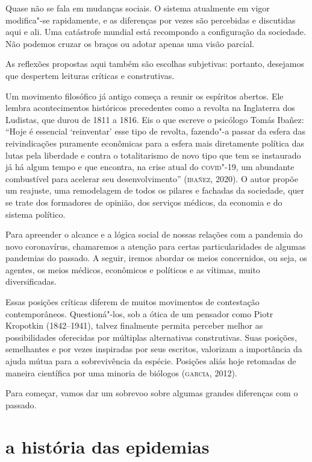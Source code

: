 Quase não se fala em mudanças sociais. O sistema atualmente em vigor
modifica"-se rapidamente, e as diferenças por vezes são percebidas e
discutidas aqui e ali. Uma catástrofe mundial está recompondo a
configuração da sociedade. Não podemos cruzar os braços ou adotar apenas
uma visão parcial.

As reflexões propostas aqui também são escolhas subjetivas: portanto,
desejamos que despertem leituras críticas e construtivas.

Um movimento filosófico já antigo começa a reunir os espíritos abertos.
Ele lembra acontecimentos históricos precedentes como a revolta na
Inglaterra dos Ludistas, que durou de 1811 a 1816. Eis o que escreve o
psicólogo Tomás Ibañez: ``Hoje é essencial `reinventar' esse tipo de
revolta, fazendo"-a passar da esfera das reivindicações puramente
econômicas para a esfera mais diretamente política das lutas pela
liberdade e contra o totalitarismo de novo tipo que tem se instaurado já
há algum tempo e que encontra, na crise atual do \textsc{covid}"-19, um abundante
combustível para acelerar seu desenvolvimento'' (\textsc{ibañez}, 2020). O autor
propõe um reajuste, uma remodelagem de todos os pilares e fachadas da
sociedade, quer se trate dos formadores de opinião, dos serviços
médicos, da economia e do sistema político.

Para apreender o alcance e a lógica social de nossas relações com a
pandemia do novo coronavírus, chamaremos a atenção para certas
particularidades de algumas pandemias do passado. A seguir, iremos
abordar os meios concernidos, ou seja, os agentes, os meios médicos,
econômicos e políticos e as vítimas, muito diversificadas.

Essas posições críticas diferem de muitos movimentos de contestação
contemporâneos. Questioná"-los, sob a ótica de um pensador como Piotr
Kropotkin (1842--1941), talvez finalmente permita perceber melhor as
possibilidades oferecidas por múltiplas alternativas construtivas. Suas
posições, semelhantes e por vezes inspiradas por seus escritos,
valorizam a importância da ajuda mútua para a sobrevivência da espécie.
Posições aliás hoje retomadas de maneira científica por uma minoria de
biólogos (\textsc{garcia}, 2012).

Para começar, vamos dar um sobrevoo sobre algumas grandes diferenças com
o passado.

\section{a história das epidemias}

